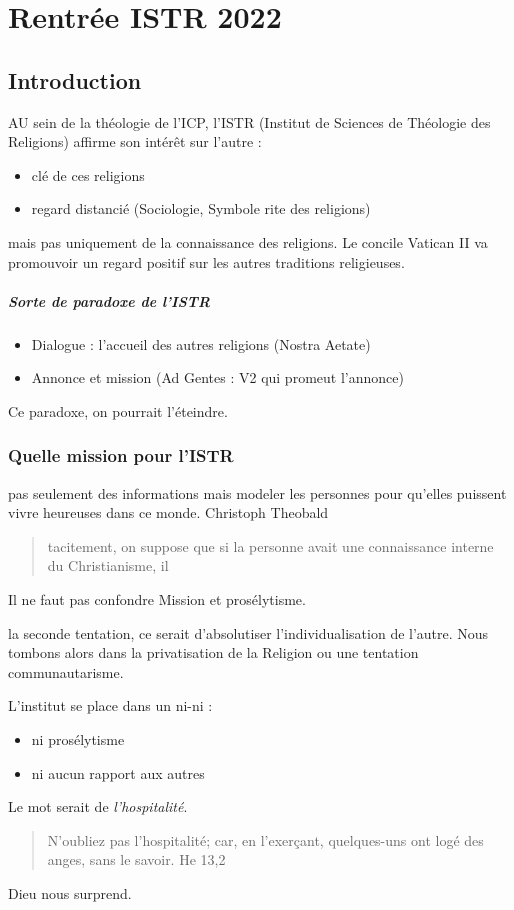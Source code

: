 \chapter{Rentrée ISTR 2022}

\section{Introduction }
AU sein de la théologie de l'ICP, l'ISTR (Institut de Sciences de Théologie des Religions) affirme son intérêt sur l'autre :
\begin{itemize}
    \item clé de ces religions
    \item regard distancié 
    (Sociologie, Symbole rite des religions)
    
\end{itemize}

mais pas uniquement de la connaissance des religions. Le concile Vatican II va promouvoir un regard positif sur les autres traditions religieuses.
\paragraph{
Sorte de paradoxe de l'ISTR}
\begin{itemize}
    \item Dialogue : l'accueil des autres religions (Nostra Aetate)
    \item Annonce et mission (Ad Gentes : V2 qui promeut l'annonce)
\end{itemize}
Ce paradoxe, on pourrait l'éteindre. 

\subsection{Quelle mission pour l'ISTR}
pas seulement des informations mais modeler les personnes pour qu'elles puissent vivre heureuses dans ce monde.
Christoph Theobald 
\begin{quote}
    tacitement, on suppose que si la personne avait une connaissance interne du Christianisme, il 
\end{quote}
Il ne faut pas confondre Mission et prosélytisme.

la seconde tentation, ce serait d'absolutiser l'individualisation de l'autre. Nous tombons alors dans la privatisation de la Religion ou une tentation communautarisme.

L'institut se place dans un ni-ni : 
\begin{itemize}
    \item ni prosélytisme
    \item ni aucun rapport aux autres
\end{itemize}
Le mot serait de \textit{l'hospitalité}.  
\begin{quote}
    N'oubliez pas l'hospitalité; car, en l'exerçant, quelques-uns ont logé des anges, sans le savoir. He 13,2
\end{quote}
Dieu nous surprend.


